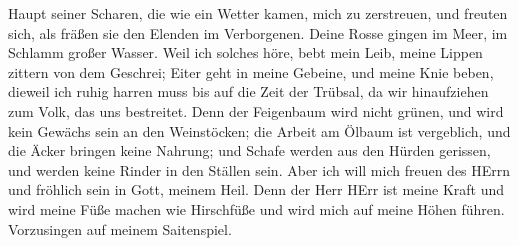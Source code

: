 Haupt seiner Scharen, die wie ein Wetter kamen, mich zu zerstreuen, und
freuten sich, als fräßen sie den Elenden im Verborgenen. 
Deine Rosse gingen im Meer, im Schlamm großer Wasser.  Weil
ich solches höre, bebt mein Leib, meine Lippen zittern von dem Geschrei;
Eiter geht in meine Gebeine, und meine Knie beben, dieweil ich ruhig
harren muss bis auf die Zeit der Trübsal, da wir hinaufziehen zum Volk,
das uns bestreitet.  Denn der Feigenbaum wird nicht grünen,
und wird kein Gewächs sein an den Weinstöcken; die Arbeit am Ölbaum ist
vergeblich, und die Äcker bringen keine Nahrung; und Schafe werden aus
den Hürden gerissen, und werden keine Rinder in den Ställen sein.
 Aber ich will mich freuen des HErrn und fröhlich sein in
Gott, meinem Heil.  Denn der Herr HErr ist meine Kraft und
wird meine Füße machen wie Hirschfüße und wird mich auf meine Höhen
führen. Vorzusingen auf meinem Saitenspiel.
